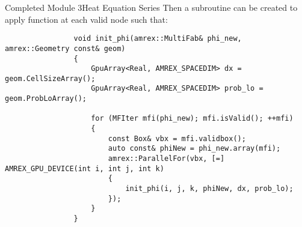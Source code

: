 \documentclass[\string~/GitHub/sthlmNordBeamerTheme/sthlmNordLightDemo.tex]{subfiles}
\begin{document}
\begin{frame}{Completed Module 3}{Heat Equation Series}
        Then a subroutine  can be created to apply function  at each valid node such that:
        \begin{center}
            \begin{verbatim}
                void init_phi(amrex::MultiFab& phi_new, amrex::Geometry const& geom)
                {
                    GpuArray<Real, AMREX_SPACEDIM> dx = geom.CellSizeArray();
                    GpuArray<Real, AMREX_SPACEDIM> prob_lo = geom.ProbLoArray();

                    for (MFIter mfi(phi_new); mfi.isValid(); ++mfi)
                    {
                        const Box& vbx = mfi.validbox();
                        auto const& phiNew = phi_new.array(mfi);
                        amrex::ParallelFor(vbx, [=] AMREX_GPU_DEVICE(int i, int j, int k)
                        {
                            init_phi(i, j, k, phiNew, dx, prob_lo);
                        });
                    }
                }
            \end{verbatim}
        \end{center}
 
\end{frame}
\end{document}
